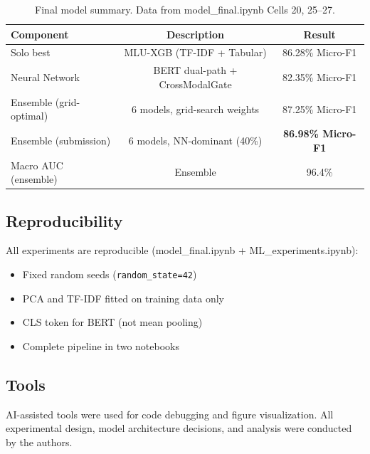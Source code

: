 \begin{table}[H]
\centering
\caption{Final model summary. Data from model\_final.ipynb Cells 20, 25--27.}
\label{tab:final_summary}
\begin{tabular}{lcc}
\toprule
\textbf{Component} & \textbf{Description} & \textbf{Result} \\
\midrule
Solo best & MLU-XGB (TF-IDF + Tabular) & 86.28\% Micro-F1 \\
Neural Network & BERT dual-path + CrossModalGate & 82.35\% Micro-F1 \\
Ensemble (grid-optimal) & 6 models, grid-search weights & 87.25\% Micro-F1 \\
Ensemble (submission) & 6 models, NN-dominant (40\%) & \textbf{86.98\% Micro-F1} \\
\midrule
Macro AUC (ensemble) & Ensemble & 96.4\% \\
\bottomrule
\end{tabular}
\end{table}

\subsection{Reproducibility}

All experiments are reproducible (model\_final.ipynb + ML\_experiments.ipynb):
\begin{itemize}
  \item Fixed random seeds (\texttt{random\_state=42})
  \item PCA and TF-IDF fitted on training data only
  \item CLS token for BERT (not mean pooling)
  \item Complete pipeline in two notebooks
\end{itemize}

\subsection{Tools}

AI-assisted tools were used for code debugging and figure visualization. All experimental design, model architecture decisions, and analysis were conducted by the authors.
